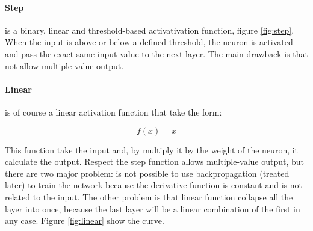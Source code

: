\documentclass[%
    corpo=12pt,
    twoside,
    oldstyle,
    autoretitolo,
    greek,
    evenboxes,
]{toptesi}
\begin{document}
\paragraph{Step} is a binary, linear and threshold-based activativation function, figure \ref{fig:step}. When the input is above or below a defined threshold, the neuron is activated and pass the exact same input value to the next layer. The main drawback is that not allow multiple-value output.

\paragraph{Linear} is of course a linear activation function that take the form:
\begin{center}
  \begin{equation}
    f(x) = x
  \end{equation}
\end{center}
This function take the input and, by multiply it by the weight of the neuron, it calculate the output. Respect the step function allows multiple-value output, but there are two major problem: is not possible to use backpropagation (treated later) to train the network because the derivative function is constant and is not related to the input. The other problem is that linear function collapse all the layer into once, because the last layer will be a linear combination of the first in any case. Figure \ref{fig:linear} show the curve.
\end{document}
